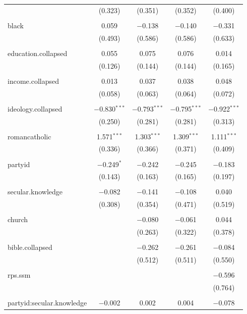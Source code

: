 \documentclass[12pt,letterpaper]{article}
\begin{document}
\begin{description}
\begin{table}[H]
\begin{tabular}{@{\extracolsep{5pt}}lcccc}
		& (0.323) & (0.351) & (0.352) & (0.400) \\ 
		& & & & \\ 
		black & 0.059 & $-$0.138 & $-$0.140 & $-$0.331 \\ 
		& (0.493) & (0.586) & (0.586) & (0.633) \\ 
		& & & & \\ 
		education.collapsed & 0.055 & 0.075 & 0.076 & 0.014 \\ 
		& (0.126) & (0.144) & (0.144) & (0.165) \\ 
		& & & & \\ 
		income.collapsed & 0.013 & 0.037 & 0.038 & 0.048 \\ 
		& (0.058) & (0.063) & (0.064) & (0.072) \\ 
		& & & & \\ 
		ideology.collapsed & $-$0.830$^{***}$ & $-$0.793$^{***}$ & $-$0.795$^{***}$ & $-$0.922$^{***}$ \\ 
		& (0.250) & (0.281) & (0.281) & (0.313) \\ 
		& & & & \\ 
		romancatholic & 1.571$^{***}$ & 1.303$^{***}$ & 1.309$^{***}$ & 1.111$^{***}$ \\ 
		& (0.336) & (0.366) & (0.371) & (0.409) \\ 
		& & & & \\ 
		partyid & $-$0.249$^{*}$ & $-$0.242 & $-$0.245 & $-$0.183 \\ 
		& (0.143) & (0.163) & (0.165) & (0.197) \\ 
		& & & & \\ 
		secular.knowledge & $-$0.082 & $-$0.141 & $-$0.108 & 0.040 \\ 
		& (0.308) & (0.354) & (0.471) & (0.519) \\ 
		& & & & \\ 
		church &  & $-$0.080 & $-$0.061 & 0.044 \\ 
		&  & (0.263) & (0.322) & (0.378) \\ 
		& & & & \\ 
		bible.collapsed &  & $-$0.262 & $-$0.261 & $-$0.084 \\ 
		&  & (0.512) & (0.511) & (0.550) \\ 
		& & & & \\ 
		rps.ssm &  &  &  & $-$0.596 \\ 
		&  &  &  & (0.764) \\ 
		& & & & \\ 
		partyid:secular.knowledge & $-$0.002 & 0.002 & 0.004 & $-$0.078 \\ 

\end{tabular}
\end{table}
\end{description}
\end{document}
